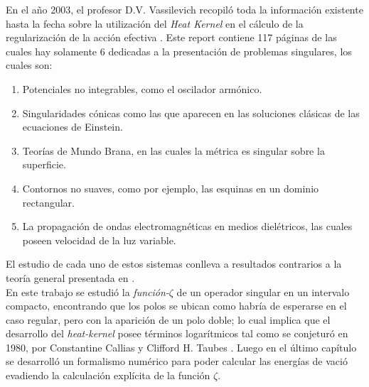 \documentclass[11pt]{book}
\begin{document}
	En el año 2003, el profesor D.V. Vassilevich recopiló toda la información existente hasta la fecha sobre la utilización del {\it Heat Kernel} en el cálculo de la regularización de la acción efectiva  \cite{Vassilevich:2003xt}. 	
	Este report contiene 117 páginas de las cuales hay solamente 6 dedicadas a la presentación de problemas singulares, los cuales son:
\begin{enumerate}
\item Potenciales no integrables, como el oscilador armónico.
\item Singularidades cónicas como las que aparecen en las soluciones clásicas de las ecuaciones de Einstein.
\item Teorías de Mundo Brana, en las cuales la métrica es singular sobre la superficie.
\item Contornos no suaves, como por ejemplo, las esquinas en un dominio rectangular.
\item La propagación de ondas electromagnéticas en medios dielétricos, las cuales poseen velocidad de la luz variable.
\end{enumerate}	
El estudio de cada uno de estos sistemas conlleva a resultados contrarios a la teoría general presentada en \cite{Vassilevich:2003xt}.\\

En este trabajo se estudió la {\it función-$\zeta$} de un operador singular en un intervalo compacto, encontrando que los polos se ubican como habría de esperarse en el caso regular, pero con la aparición de un polo doble; lo cual implica que el desarrollo del {\it heat-kernel} posee términos logarítmicos tal como se conjeturó en 1980, por Constantine Callias y Clifford H. Taubes \cite{callias1980}. Luego en el último capítulo se desarrolló un formalismo numérico para poder calcular las energías de vació evadiendo la calculación explícita de la función $\zeta$.\\

\end{document}
